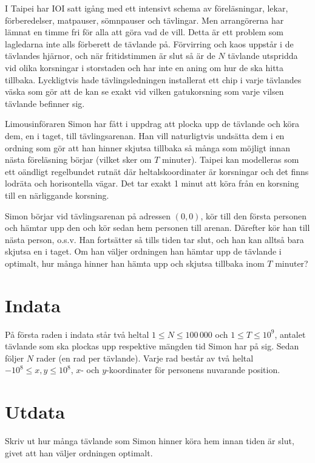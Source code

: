 
I Taipei har IOI satt igång med ett intensivt schema av föreläsningar, lekar,
förberedelser, matpauser, sömnpauser och tävlingar. Men arrangörerna har lämnat
en timme fri för alla att göra vad de vill. Detta är ett problem som lagledarna
inte alls förberett de tävlande på. Förvirring och kaos uppstår i de tävlandes
hjärnor, och när fritidstimmen är slut så är de $N$ tävlande utspridda vid
olika korsningar i storstaden och har inte en aning om hur de ska hitta
tillbaka. Lyckligtvis hade tävlingsledningen installerat ett chip i varje
tävlandes väska som gör att de kan se exakt vid vilken gatukorsning som varje
vilsen tävlande befinner sig.

Limousinföraren Simon har fått i uppdrag att plocka upp de tävlande och köra
dem, en i taget, till tävlingsarenan. Han vill naturligtvis undsätta dem i en
ordning som gör att han hinner skjutsa tillbaka så många som möjligt innan
nästa föreläsning börjar (vilket sker om $T$ minuter). Taipei kan modelleras
som ett oändligt regelbundet rutnät där heltalskoordinater är korsningar och
det finns lodräta och horisontella vägar. Det tar exakt 1 minut att köra från
en korsning till en närliggande korsning.

Simon börjar vid tävlingsarenan på adressen $(0, 0)$, kör till den första
personen och hämtar upp den och kör sedan hem personen till arenan. Därefter
kör han till nästa person, o.s.v. Han fortsätter så tills tiden tar slut, och
han kan alltså bara skjutsa en i taget. Om han väljer ordningen han hämtar upp
de tävlande i optimalt, hur många hinner han hämta upp och skjutsa tillbaka
inom $T$ minuter?

\section*{Indata}
På första raden i indata står två heltal $1 \leq N \leq 100\,000$ och $1 \leq T
\leq 10^9$, antalet tävlande som ska plockas upp respektive mängden tid Simon
har på sig. Sedan följer $N$ rader (en rad per tävlande). Varje rad består av
två heltal $-10^8 \leq x, y \leq 10^8$, $x$- och $y$-koordinater för personens
nuvarande position.

\section*{Utdata}
Skriv ut hur många tävlande som Simon hinner köra hem innan tiden är slut,
givet att han väljer ordningen optimalt.

